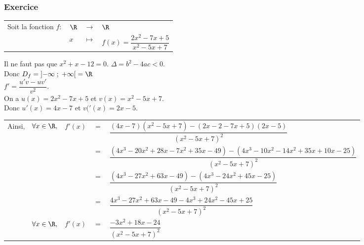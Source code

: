 \newpage

\subsubsection{Exercice }

\begin{tabular}{llll}
Soit la fonction $f :$ & $\R$ & $\longrightarrow$ & $\R$ \\
& $x$ & $\longmapsto$ & $f(x) = \dfrac{2x^2 -7x +5}{x^2 - 5x + 7}$ \\
\end{tabular}

\vspace*{.3cm}

Il ne faut pas que $x^2 + x - 12 = 0$. $\Delta = b^2 - 4ac < 0$. \\

Donc $D_f = \left]-\infty\; ; \; +\infty\right[ = \R$ \\

$f' = \dfrac{u'v - uv'}{v^2}$. \\

On a $u(x) = 2x^2 - 7x + 5$ et $v(x) = x^2 -5x +7$. \\
Donc $u'(x) = 4x - 7$ et $v('(x) = 2x-5$. \\

\begin{tabular}{lllll}
Ainsi, & $\forall x \in \R,$ & $f'(x)$ & $=$ & $\dfrac{\left(4x-7\right)\left(x^2 -5x +7\right)-\left(2x-2 -7x +5\right)\left(2x-5\right)}{\left(x^2 - 5x +7\right)^2}$ \vspace*{.3cm} \\
& & & $=$ & $\dfrac{\left(4x^3 - 20x^2 + 28x - 7x^2 + 35x - 49\right)-\left(4x^3 - 10x^2 - 14x^2 + 35x + 10x -25\right)}{\left(x^2 - 5x +7\right)^2}$ \vspace*{.3cm} \\
& & & $=$ & $\dfrac{\left(4x^3 - 27x^2 + 63x - 49\right)-\left(4x^3 - 24x^2 + 45x - 25\right)}{\left(x^2 - 5x +7\right)^2}$ \vspace*{.3cm} \\
& & & $=$ & $\dfrac{4x^3 - 27x^2 + 63x - 49 - 4x^3 + 24x^2 - 45x + 25}{\left(x^2 - 5x +7\right)^2}$ \vspace*{.3cm} \\
& $\forall x \in \R,$ & $f'(x)$ & $=$ & $\dfrac{-3x^2 + 18x - 24}{\left(x^2 - 5x +7\right)^2}$ \\
\end{tabular}

\vspace*{.3cm} 

